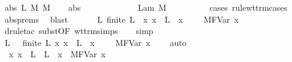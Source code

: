 \begin{isabellebody}
\ {\isacharparenleft}abs\ L\ M\ M{\isacharprime}{\isacharparenright}\isanewline
\ \ \isamarkupfalse%
\ abs{\isacharparenleft}{}{\isacharparenright}\ \isamarkupfalse%
\ {\isasympi}\ {\isasymtau}\ \ {}{\isacharcolon}\ {\isachardoublequoteopen}{\isasymsigma}\ {\isacharequal}\ {\isasympi}\ {\isasymrightarrow}\ {\isasymtau}{\isachardoublequoteclose}\ {\isachardoublequoteopen}{\isasymGamma}\ {\isasymturnstile}\ Lam\ M\ {\isacharcolon}\ {\isasympi}\ {\isasymrightarrow}\ {\isasymtau}{\isachardoublequoteclose}\isanewline
\ \ \ \ \isamarkupfalse%
\ {\isacharparenleft}cases\ rule{\isacharcolon}wt{\isacharunderscore}trm{\isachardot}cases{\isacharparenright}\ \isamarkupfalse%
\ abs{\isachardot}prems\ \isamarkupfalse%
\ blast\isanewline
\ \ \isamarkupfalse%
\ {}{\isacharparenleft}{}{\isacharparenright}\ \isamarkupfalse%
\ {\isachardoublequoteopen}{\isasymexists}L{\isachardot}\ finite\ L\ {\isasymand}\ {\isacharparenleft}{\isasymforall}x{\isachardot}\ x\ {\isasymnotin}\ L\ {\isasymlongrightarrow}\ {\isacharparenleft}x{\isacharcomma}\ {\isasympi}{\isacharparenright}\ {\isacharhash}\ {\isasymGamma}\ {\isasymturnstile}\ M{\isacharcircum}FVar\ x\ {\isacharcolon}\ {\isasymtau}{\isacharparenright}{\isachardoublequoteclose}\isanewline
\ \ \isamarkupfalse%
\ {\isacharparenleft}drule{\isacharunderscore}tac\ subst{\isacharbrackleft}OF\ wt{\isacharunderscore}trm{\isachardot}simps{\isacharbrackright}{\isacharparenright}\isanewline
\ \ \isamarkupfalse%
\ simp\isanewline
\ \ \isamarkupfalse%
\ \isamarkupfalse%
\ L{\isacharprime}\ \ {}{\isacharcolon}\ {\isachardoublequoteopen}finite\ L{\isacharprime}{\isachardoublequoteclose}\ {\isachardoublequoteopen}{\isasymAnd}x{\isachardot}\ x\ {\isasymnotin}\ L{\isacharprime}\ {\isasymLongrightarrow}\ {\isacharparenleft}x{\isacharcomma}\ {\isasympi}{\isacharparenright}\ {\isacharhash}\ {\isasymGamma}\ {\isasymturnstile}\ M{\isacharcircum}FVar\ x\ {\isacharcolon}\ {\isasymtau}{\isachardoublequoteclose}\ \isamarkupfalse%
\ auto\isanewline
\isanewline
\ \ \isamarkupfalse%
\ {}{\isacharcolon}\ {\isachardoublequoteopen}{\isasymAnd}x{\isachardot}\ x\ {\isasymnotin}\ L\ {\isasymunion}\ L{\isacharprime}\ {\isasymLongrightarrow}\ {\isacharparenleft}{\isacharparenleft}x{\isacharcomma}{\isasympi}{\isacharparenright}{\isacharhash}{\isasymGamma}{\isacharparenright}\ {\isasymturnstile}\ M{\isacharprime}{\isacharcircum}FVar\ x\ {\isacharcolon}\ {\isasymtau}{\isachardoublequoteclose}\isanewline

\end{isabellebody}

